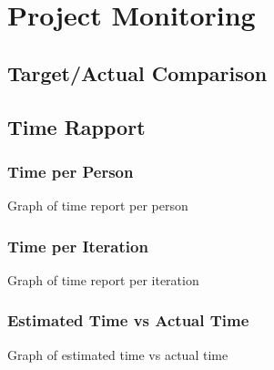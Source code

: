\chapter{Project Monitoring}\label{project monitoring}

\section{Target/Actual Comparison}


\section{Time Rapport}\label{time-rapport}


\subsection{Time per Person}\label{time-per-person}

Graph of time report per person

\subsection{Time per Iteration}\label{time-per-iteration}

Graph of time report per iteration

\subsection{Estimated Time vs Actual
Time}\label{estimated-time-vs-actual-time}

Graph of estimated time vs actual time

\newpage{}